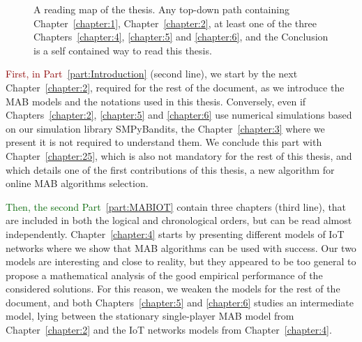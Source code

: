 \begin{figure}[h!]
{
    }
    \caption[Organization of the thesis: a reading map.]{A reading map of the thesis. Any top-down path containing Chapter~\ref{chapter:1}, Chapter~\ref{chapter:2}, at least one of the three Chapters~\ref{chapter:4}, \ref{chapter:5} and \ref{chapter:6}, and the Conclusion is a self contained way to read this thesis.}
    \label{fig:1:organization}
\end{figure}

\textcolor{darkred}{First, in Part~\ref{part:Introduction}} (second line), we start by the next Chapter~\ref{chapter:2}, required for the rest of the document, as we introduce the MAB models and the notations used in this thesis.
Conversely, even if Chapters~\ref{chapter:2}, \ref{chapter:5} and \ref{chapter:6} use numerical simulations based on our simulation library SMPyBandits, the Chapter~\ref{chapter:3} where we present it is not required to understand them.
We conclude this part with Chapter~\ref{chapter:25}, which is also not mandatory for the rest of this thesis, and which details one of the first contributions of this thesis, a new algorithm for online MAB algorithms selection.

\textcolor{darkgreen}{Then, the second Part~\ref{part:MABIOT}} contain three chapters (third line), that are included in both the logical and chronological orders, but can be read almost independently.
Chapter~\ref{chapter:4} starts by presenting different models of IoT networks where we show that MAB algorithms can be used with success. Our two models are interesting and close to reality, but they appeared to be too general to propose a mathematical analysis of the good empirical performance of the considered solutions.
For this reason, we weaken the models for the rest of the document,
and both Chapters~\ref{chapter:5} and \ref{chapter:6} studies an intermediate model, lying between the stationary single-player MAB model from Chapter~\ref{chapter:2} and the IoT networks models from Chapter~\ref{chapter:4}.



